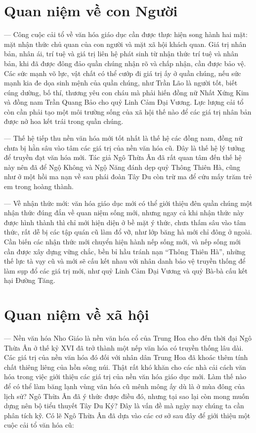\section{Quan niệm về con Người} %
\label{sec:47_48_con_nguoi}

--- Công cuộc cải tổ về văn hóa giáo dục cần được thực hiện song hành hai mặt: mặt nhận thức chủ quan của con người và mặt xã hội khách quan. Giá trị nhân bản, nhân ái, trí tuệ và giá trị liên hệ phát sinh từ nhận thức trí tuệ và nhân bản, khi đã được đông đảo quần chúng nhận rõ và chấp nhận, cần được bảo vệ. Các sức mạnh võ lực, vật chất có thể cướp đi giá trị ấy ở quần chúng, nếu sức mạnh kia đe dọa sinh mệnh của quần chúng, như Trần Lão là người tốt, biết cúng dường, bố thí, thương yêu con cháu mà phải hiến đồng nữ Nhất Xứng Kim và đồng nam Trần Quang Bảo cho quỷ Linh Cảm Đại Vương. Lực lượng cải tổ còn cần phải tạo một môi trường sống của xã hội thế nào để các giá trị nhân bản được nở hoa kết trái trong quần chúng.

--- Thế hệ tiếp thu nền văn hóa mới tốt nhất là thế hệ các đồng nam, đồng nữ chưa bị hằn sâu vào tâm các giá trị của nền văn hóa cũ. Đây là thế hệ lý tưởng để truyền đạt văn hóa mới. Tác giả Ngô Thừa Ân đã rất quan tâm đến thế hệ này nên đã để Ngộ Không và Ngộ Năng đánh dẹp quỷ Thông Thiên Hà, cũng như ở một hồi ma nạn về sau phái đoàn Tây Du còn trừ ma để cứu mấy trăm trẻ em trong hoàng thành.

--- Về nhận thức mới: văn hóa giáo dục mới có thể giới thiệu đên quần chúng một nhận thức đúng đắn về quan niệm sống mới, nhưng ngay cả khi nhận thức này được hình thành thì chỉ mới hiện diện ở bề mặt ý thức, chưa thấm sâu vào tâm thức, rất dễ bị các tập quán cũ làm đổ vỡ, như lớp băng hà mới chỉ đông ở ngoài. Cần biến các nhận thức mới chuyển hiện hành nếp sống mới, và nếp sống mới cần được xây dựng vững chắc, bền bỉ hầu tránh nạn ``Thông Thiên Hà'', những thế lực tà vạy cũ và mới sẽ cấu kết nhau với nhân danh bảo vệ truyền thống để làm sụp đổ các giá trị mới, như quỷ Linh Cảm Đại Vương và quỷ Bà-bà cấu kết hại Đường Tăng.

\section{Quan niệm về xã hội} %
\label{sec:47_48_xa_hoi}

--- Nền văn hóa Nho Giáo là nền văn hóa cổ của Trung Hoa cho đến thời đại Ngô Thừa Ân ở thế kỷ XVI đã trở thành một nếp văn hóa có truyền thống lâu dài. Các giá trị của nền văn hóa đó đối với nhân dân Trung Hoa đã khoác thêm tính chất thiêng liêng của hồn sông núi. Thật rất khó khăn cho các nhà cải cách văn hóa trong việc giới thiệu các giá trị của nền văn hóa giáo dục mới. Làm thế nào để có thể làm băng lạnh vùng văn hóa cũ mênh mông ấy dù là ở mùa đông của lịch sử? Ngô Thừa Ân đã ý thức được điều đó, nhưng tại sao lại còn mong muốn dựng nên bộ tiểu thuyết Tây Du Ký? Đây là vấn đề mà ngày nay chúng ta cần phân tích kỹ. Có lẽ Ngô Thừa Ân đã dựa vào các cơ sở sau đây để giới thiệu một cuộc cải tổ văn hóa cũ:

